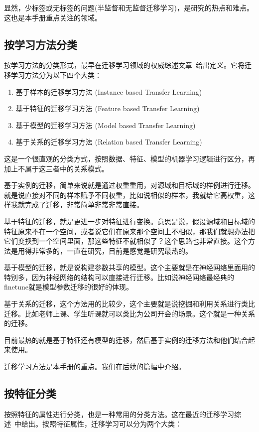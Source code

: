显然，少标签或无标签的问题(半监督和无监督迁移学习)，是研究的热点和难点。这也是本手册重点关注的领域。

\subsection{按学习方法分类}
按学习方法的分类形式，最早在迁移学习领域的权威综述文章~\cite{pan2010survey}给出定义。它将迁移学习方法分为以下四个大类：

\begin{enumerate}
	\item 基于样本的迁移学习方法 (Instance based Transfer Learning)
	\item 基于特征的迁移学习方法 (Feature based Transfer Learning)
	\item 基于模型的迁移学习方法 (Model based Transfer Learning)
	\item 基于关系的迁移学习方法 (Relation based Transfer Learning)
\end{enumerate}

这是一个很直观的分类方式，按照数据、特征、模型的机器学习逻辑进行区分，再加上不属于这三者中的关系模式。

基于实例的迁移，简单来说就是通过权重重用，对源域和目标域的样例进行迁移。就是说直接对不同的样本赋予不同权重，比如说相似的样本，我就给它高权重，这样我就完成了迁移，非常简单非常非常直接。

基于特征的迁移，就是更进一步对特征进行变换。意思是说，假设源域和目标域的特征原来不在一个空间，或者说它们在原来那个空间上不相似，那我们就想办法把它们变换到一个空间里面，那这些特征不就相似了？这个思路也非常直接。这个方法是用得非常多的，一直在研究，目前是感觉是研究最热的。

基于模型的迁移，就是说构建参数共享的模型。这个主要就是在神经网络里面用的特别多，因为神经网络的结构可以直接进行迁移。比如说神经网络最经典的finetune就是模型参数迁移的很好的体现。

基于关系的迁移，这个方法用的比较少，这个主要就是说挖掘和利用关系进行类比迁移。比如老师上课、学生听课就可以类比为公司开会的场景。这个就是一种关系的迁移。

目前最热的就是基于特征还有模型的迁移，然后基于实例的迁移方法和他们结合起来使用。

迁移学习方法是本手册的重点。我们在后续的篇幅中介绍。

\subsection{按特征分类}

按照特征的属性进行分类，也是一种常用的分类方法。这在最近的迁移学习综述~\cite{weiss2016survey}中给出。按照特征属性，迁移学习可以分为两个大类：


